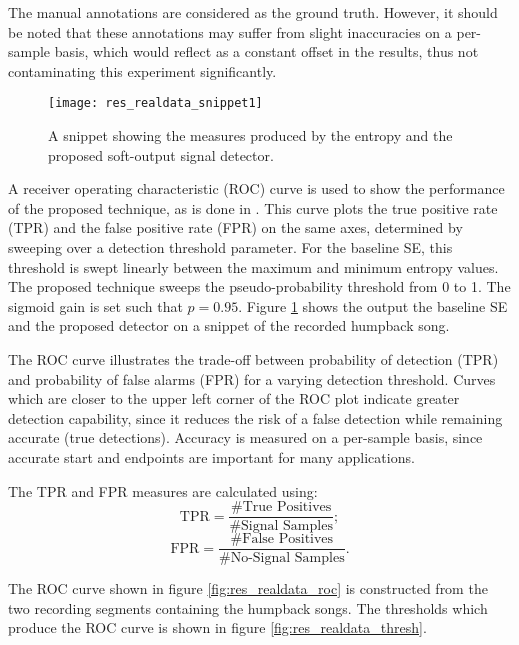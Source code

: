 The manual annotations are considered as the ground truth. However, it should be noted that these annotations may suffer from slight inaccuracies on a per-sample basis, which would reflect as a constant offset in the results, thus not contaminating this experiment significantly.

 \begin{figure}[h!]
	\centering
	\texttt{[image: res\_realdata\_snippet1]}
	\caption{A snippet showing the measures produced by the entropy and the proposed soft-output signal detector.}
	\label{fig:res_realdata_snippet1}
\end{figure}

A receiver operating characteristic (ROC) curve is used to show the performance of the proposed technique, as is done in \citep{entropyJASA}. This curve plots the true positive rate (TPR) and the false positive rate (FPR) on the same axes, determined by sweeping over a detection threshold parameter. For the baseline SE, this threshold is swept linearly between the maximum and minimum entropy values. The proposed technique sweeps the pseudo-probability threshold from 0 to 1. The sigmoid gain is set such that $p=0.95$. Figure \ref{fig:res_realdata_snippet1} shows the output the baseline SE and the proposed detector on a snippet of the recorded humpback song.



The ROC curve illustrates the trade-off between probability of detection (TPR) and probability of false alarms (FPR) for a varying detection threshold. Curves which are closer to the upper left corner of the ROC plot indicate greater detection capability, since it reduces the risk of a false detection while remaining accurate (true detections). Accuracy is measured on a per-sample basis, since accurate start and endpoints are important for many applications.

The TPR and FPR measures are calculated using:
\begin{equation*}
	\text{TPR} = \frac{\text{\# True Positives}}{\text{\# Signal Samples}};
\end{equation*}
\begin{equation*}
	\text{FPR} = \frac{\text{\# False Positives}}{\text{\# No-Signal Samples}}.
\end{equation*}




The ROC curve shown in figure \ref{fig:res_realdata_roc} is constructed from the two recording segments containing the humpback songs. The thresholds which produce the ROC curve is shown in figure \ref{fig:res_realdata_thresh}. 

